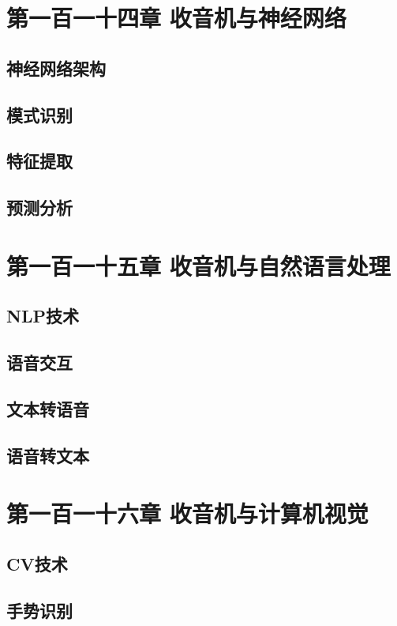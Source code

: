 \documentclass[12pt,UTF8]{ctexbook}
\begin{document}
\chapter{第一百一十四章 收音机与神经网络}

\section{神经网络架构}
\section{模式识别}
\section{特征提取}
\section{预测分析}

\chapter{第一百一十五章 收音机与自然语言处理}

\section{NLP技术}
\section{语音交互}
\section{文本转语音}
\section{语音转文本}

\chapter{第一百一十六章 收音机与计算机视觉}

\section{CV技术}
\section{手势识别}
\end{document}
